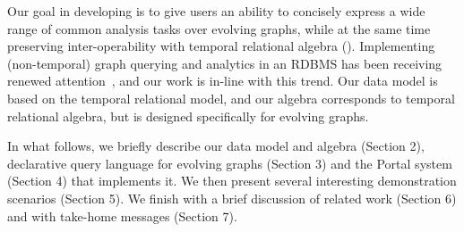   Our goal in developing \tga
is to give users an ability to concisely express a wide range of
common analysis tasks over evolving graphs, while at the same time
preserving inter-operability with temporal relational algebra (\tra).
Implementing (non-temporal) graph querying and analytics in an RDBMS
has been receiving renewed
attention~\cite{DBLP:conf/sigmod/AbergerTOR16,DBLP:conf/sigmod/SunFSKHX15,DBLP:journals/pvldb/Xirogiannopoulos15},
and our work is in-line with this trend. Our data model is based on
the temporal relational model, and our algebra corresponds to temporal
relational algebra, but is designed specifically for evolving graphs.

In what follows, we briefly describe our data model and algebra (Section 2), declarative query
language for evolving graphs (Section 3) and the Portal system
(Section 4) that implements it. We then present several
interesting demonstration scenarios (Section 5). We finish
with a brief discussion of related work (Section 6) and with
take-home messages (Section 7).


